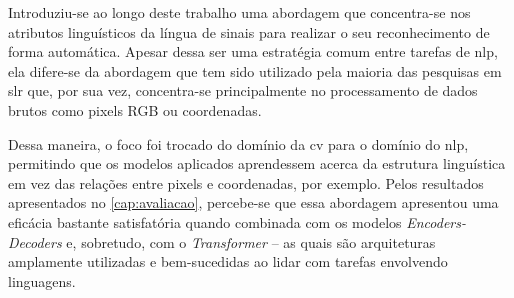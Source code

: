 Introduziu-se ao longo deste trabalho uma abordagem que concentra-se nos atributos linguísticos da língua de sinais para realizar o seu reconhecimento de forma automática.
Apesar dessa ser uma estratégia comum entre tarefas de \acrfull{nlp}, ela difere-se da abordagem que tem sido utilizado pela maioria das pesquisas em \acrfull{slr} que, por sua vez, concentra-se principalmente no processamento de dados brutos como pixels RGB ou coordenadas.


Dessa maneira, o foco foi trocado do domínio da \acrfull{cv} para o domínio do \acrshort{nlp}, permitindo que os modelos aplicados aprendessem acerca da estrutura linguística em vez das relações entre pixels e coordenadas, por exemplo.
Pelos resultados apresentados no \autoref{cap:avaliacao}, percebe-se que essa abordagem apresentou uma eficácia bastante satisfatória quando combinada com os modelos \textit{Encoders-Decoders} e, sobretudo, com o \textit{Transformer} -- as quais são arquiteturas amplamente utilizadas e bem-sucedidas ao lidar com tarefas envolvendo linguagens.


